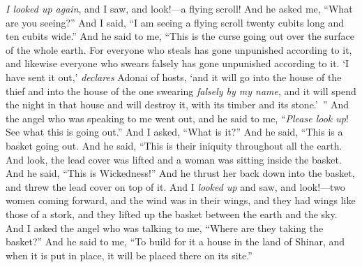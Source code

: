 \begin{biblechapter} %
 \textit{I looked up again}, and I saw, and look!—a flying scroll!
\verse And he asked me, “What are you seeing?” And I said, “I am seeing a flying scroll twenty cubits long and ten cubits wide.”
\verse And he said to me, “This is the curse going out over the surface of the whole earth. For everyone who steals has gone unpunished according to it, and likewise everyone who swears falsely has gone unpunished according to it.
\verse ‘I have sent it out,’ \textit{declares} Adonai of hosts, ‘and it will go into the house of the thief and into the house of the one swearing \textit{falsely by my name}, and it will spend the night in that house and will destroy it, with its timber and its stone.’ ”
 And the angel who was speaking to me went out, and he said to me, “\textit{Please look up}! See what this is going out.”
\verse And I asked, “What is it?” And he said, “This is a basket going out. And he said, “This is their iniquity throughout all the earth.
\verse And look, the lead cover was lifted and a woman was sitting inside the basket.
\verse And he said, “This is Wickedness!” And he thrust her back down into the basket, and threw the lead cover on top of it.
\verse And I \textit{looked up} and saw, and look!—two women coming forward, and the wind was in their wings, and they had wings like those of a stork, and they lifted up the basket between the earth and the sky.
\verse And I asked the angel who was talking to me, “Where are they taking the basket?”
\verse And he said to me, “To build for it a house in the land of Shinar, and when it is put in place, it will be placed there on its site.”
\end{biblechapter}

